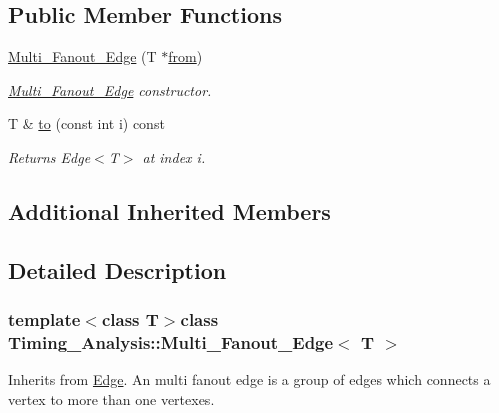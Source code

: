 \subsection*{Public Member Functions}
\begin{DoxyCompactItemize}
\item 
\hyperlink{classTiming__Analysis_1_1Multi__Fanout__Edge_a877f7672fb4fbabf49943fd3c86b7f59}{Multi\-\_\-\-Fanout\-\_\-\-Edge} (T $\ast$\hyperlink{classTiming__Analysis_1_1Edge_a47020ea89fd9fde438adc814a731a23d}{from})
\begin{DoxyCompactList}\small\item\em \hyperlink{classTiming__Analysis_1_1Multi__Fanout__Edge}{Multi\-\_\-\-Fanout\-\_\-\-Edge} constructor. \end{DoxyCompactList}\item 
T \& \hyperlink{classTiming__Analysis_1_1Multi__Fanout__Edge_a77ac79088e9ef11d222e777e2963f676}{to} (const int i) const 
\begin{DoxyCompactList}\small\item\em Returns Edge$<$\-T$>$ at index i. \end{DoxyCompactList}\end{DoxyCompactItemize}
\subsection*{Additional Inherited Members}


\subsection{Detailed Description}
\subsubsection*{template$<$class T$>$class Timing\-\_\-\-Analysis\-::\-Multi\-\_\-\-Fanout\-\_\-\-Edge$<$ T $>$}

Inherits from \hyperlink{classTiming__Analysis_1_1Edge}{Edge}. An multi fanout edge is a group of edges which connects a vertex to more than one vertexes. 



